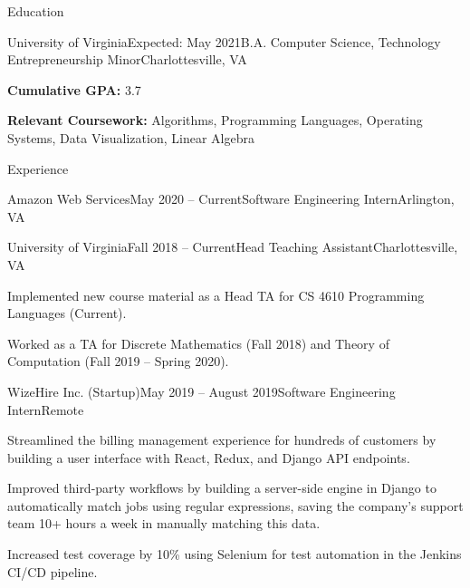 \documentclass{resume}
\begin{document}
\vspace{-1em}
\begin{rSection}{Education}

  \begin{rSubsection}{University of Virginia}{Expected: May 2021}{B.A. Computer Science, Technology Entrepreneurship Minor}{Charlottesville, VA}
    \item \textbf{Cumulative GPA:} 3.7
    \item \textbf{Relevant Coursework:} Algorithms, Programming Languages, Operating Systems, Data Visualization, Linear Algebra
  \end{rSubsection}

\end{rSection}

\begin{rSection}{Experience}
  \begin{rSubsection}{Amazon Web Services}{May 2020 -- Current}{Software Engineering Intern}{Arlington, VA}
    \item[]
  \end{rSubsection}
  \vspace{-1em}

  \begin{rSubsection}{University of Virginia}{Fall 2018 -- Current}{Head Teaching Assistant}{Charlottesville, VA}
    \item Implemented new course material as a Head TA for CS 4610 Programming Languages (Current).
    \item Worked as a TA for Discrete Mathematics (Fall 2018) and Theory of Computation (Fall 2019 -- Spring 2020).
  \end{rSubsection}

  \begin{rSubsection}{WizeHire Inc. (Startup)}{May 2019 -- August 2019}{Software Engineering Intern}{Remote}
    \item Streamlined the billing management experience for hundreds of customers by building a user interface with React, Redux, and Django API endpoints.
    \item Improved third-party workflows by building a server-side engine in Django to automatically match jobs using regular expressions, saving the company's support team 10+ hours a week in manually matching this data.
    \item Increased test coverage by 10\% using Selenium for test automation in the Jenkins CI/CD pipeline.
  \end{rSubsection}


\end{rSection}
\end{document}
